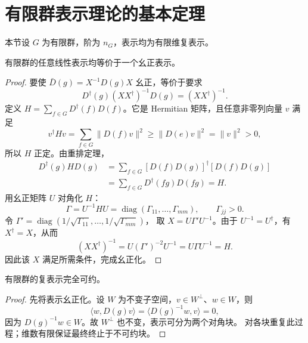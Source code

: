 \section{有限群表示理论的基本定理}
本节设 $G$ 为有限群，阶为 $n_G$，表示均为有限维复表示。

\begin{theorem}[定理 1：幺正化]
有限群的任意线性表示均等价于一个幺正表示。
\end{theorem}
\begin{proof}
要使 $\bar D\left(g\right)=X^{-1}D\left(g\right)X$ 幺正，等价于要求
\begin{equation}
D^\dagger\left(g\right)\left(XX^\dagger\right)^{-1}D\left(g\right)=\left(XX^\dagger\right)^{-1}.
\end{equation}
定义 $H=\sum_{f\in G}D^\dagger\left(f\right)D\left(f\right)$。它是 Hermitian 矩阵，且任意非零列向量 $v$ 满足
\begin{equation}
v^\dagger Hv=\sum_{f\in G}\|D\left(f\right)v\|^2\geqslant\|D\left(e\right)v\|^2=\|v\|^2>0,
\end{equation}
所以 $H$ 正定。由重排定理，
\begin{align}
D^\dagger\left(g\right)HD\left(g\right)
&=\sum_{f\in G}\left[D\left(f\right)D\left(g\right)\right]^\dagger\left[D\left(f\right)D\left(g\right)\right]\\
&=\sum_{f\in G}D^\dagger\left(fg\right)D\left(fg\right)=H.
\end{align}
用幺正矩阵 $U$ 对角化 $H$：
\begin{equation}
\Gamma=U^{-1}HU=\operatorname{diag}\left(\Gamma_{11},\ldots,\Gamma_{mm}\right),\qquad \Gamma_{jj}>0.
\end{equation}
令 $\Gamma'=\operatorname{diag}\left(1/\sqrt{\Gamma_{11}},\ldots,1/\sqrt{\Gamma_{mm}}\right)$，
取 $X=U\Gamma'U^{-1}$。由于 $U^{-1}=U^\dagger$，有 $X^\dagger=X$，从而
\begin{equation}
\left(XX^\dagger\right)^{-1}=U\left(\Gamma'\right)^{-2}U^{-1}=U\Gamma U^{-1}=H.
\end{equation}
因此该 $X$ 满足所需条件，完成幺正化。
\end{proof}

\begin{proposition}[完全可约性]
有限群的复表示完全可约。
\end{proposition}
\begin{proof}
先将表示幺正化。设 $W$ 为不变子空间，$v\in W^\perp$、$w\in W$，则
\begin{equation}
\langle w,D\left(g\right)v\rangle=\langle D\left(g\right)^{-1}w,v\rangle=0,
\end{equation}
因为 $D\left(g\right)^{-1}w\in W$。故 $W^\perp$ 也不变，表示可分为两个对角块。
对各块重复此过程；维数有限保证最终终止于不可约块。
\end{proof}

